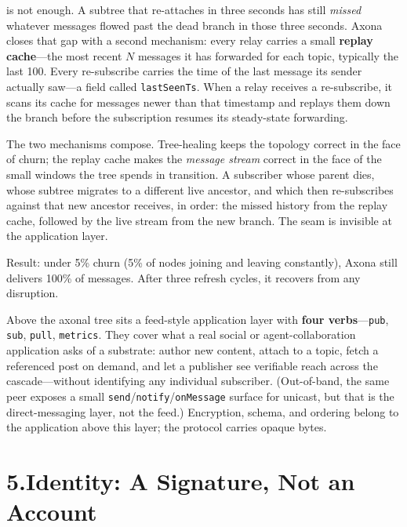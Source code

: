 \documentclass[nobib,justified]{tufte-handout}
\begin{document}
 is not enough.  A subtree that re-attaches in three seconds has still \emph{missed} whatever messages flowed past the dead branch in those three seconds.  Axona closes that gap with a second mechanism: every relay carries a small \textbf{replay cache}---the most recent $N$ messages it has forwarded for each topic, typically the last 100. Every re-subscribe carries the time of the last message its sender actually saw---a field called \texttt{lastSeenTs}.  When a relay receives a re-subscribe, it scans its cache for messages newer than that timestamp and replays them down the branch before the subscription resumes its steady-state forwarding.

The two mechanisms compose. Tree-healing keeps the topology correct in the face of churn; the replay cache makes the \emph{message stream} correct in the face of the small windows the tree spends in transition. A subscriber whose parent dies, whose subtree migrates to a different live ancestor, and which then re-subscribes against that new ancestor receives, in order: the missed history from the replay cache, followed by the live stream from the new branch. The seam is invisible at the application layer.

Result: under 5\% churn (5\% of nodes joining and leaving constantly), Axona still delivers 100\% of messages. After three refresh cycles, it recovers from any disruption.

Above the axonal tree sits a feed-style application layer with \textbf{four verbs}---\texttt{pub}, \texttt{sub}, \texttt{pull}, \texttt{metrics}. They cover what a real social or agent-collaboration application asks of a substrate: author new content, attach to a topic, fetch a referenced post on demand, and let a publisher see verifiable reach across the cascade---without identifying any individual subscriber. (Out-of-band, the same peer exposes a small \texttt{send}/\texttt{notify}/\texttt{onMessage} surface for unicast, but that is the direct-messaging layer, not the feed.)  Encryption, schema, and ordering belong to the application above this layer; the protocol carries opaque bytes.

\section{5.\quad Identity: A Signature, Not an Account}
\end{document}
